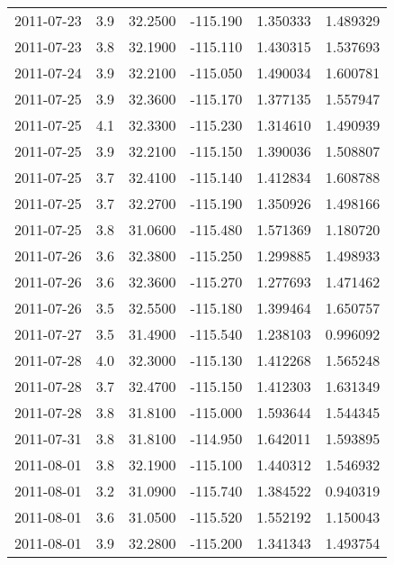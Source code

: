 \begin{tabular}{lrrrrr}
2011-07-23 &       3.9 &  32.2500 &  -115.190 &         1.350333 &         1.489329 \\
2011-07-23 &       3.8 &  32.1900 &  -115.110 &         1.430315 &         1.537693 \\
2011-07-24 &       3.9 &  32.2100 &  -115.050 &         1.490034 &         1.600781 \\
2011-07-25 &       3.9 &  32.3600 &  -115.170 &         1.377135 &         1.557947 \\
2011-07-25 &       4.1 &  32.3300 &  -115.230 &         1.314610 &         1.490939 \\
2011-07-25 &       3.9 &  32.2100 &  -115.150 &         1.390036 &         1.508807 \\
2011-07-25 &       3.7 &  32.4100 &  -115.140 &         1.412834 &         1.608788 \\
2011-07-25 &       3.7 &  32.2700 &  -115.190 &         1.350926 &         1.498166 \\
2011-07-25 &       3.8 &  31.0600 &  -115.480 &         1.571369 &         1.180720 \\
2011-07-26 &       3.6 &  32.3800 &  -115.250 &         1.299885 &         1.498933 \\
2011-07-26 &       3.6 &  32.3600 &  -115.270 &         1.277693 &         1.471462 \\
2011-07-26 &       3.5 &  32.5500 &  -115.180 &         1.399464 &         1.650757 \\
2011-07-27 &       3.5 &  31.4900 &  -115.540 &         1.238103 &         0.996092 \\
2011-07-28 &       4.0 &  32.3000 &  -115.130 &         1.412268 &         1.565248 \\
2011-07-28 &       3.7 &  32.4700 &  -115.150 &         1.412303 &         1.631349 \\
2011-07-28 &       3.8 &  31.8100 &  -115.000 &         1.593644 &         1.544345 \\
2011-07-31 &       3.8 &  31.8100 &  -114.950 &         1.642011 &         1.593895 \\
2011-08-01 &       3.8 &  32.1900 &  -115.100 &         1.440312 &         1.546932 \\
2011-08-01 &       3.2 &  31.0900 &  -115.740 &         1.384522 &         0.940319 \\
2011-08-01 &       3.6 &  31.0500 &  -115.520 &         1.552192 &         1.150043 \\
2011-08-01 &       3.9 &  32.2800 &  -115.200 &         1.341343 &         1.493754 \\

\end{tabular}
